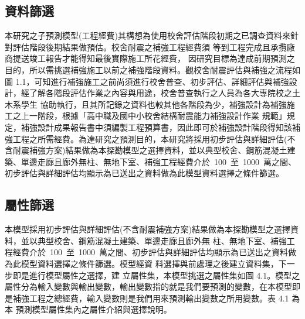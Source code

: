 \subsection{資料篩選}

本研究之子預測模型(工程經費)其構想為使用校舍評估階段初期之已調查資料來針對評估階段後期結果做預估。校舍耐震之補強工程經費須 等到工程完成且承攬廠商提送竣工報告才能得知最後實際施工所花經費， 因研究目標為達成前期預測之目的，所以需挑選補強施工以前之補強階段資料。觀校舍耐震評估與補強之流程如圖 1.1，可知進行補強施工之前尚須進行校舍普查、初步評估、詳細評估與補強設計，經了解各階段評估作業之內容與用途，校舍普查執行之人員為各大專院校之土木系學生 協助執行，且其所記錄之資料也較其他各階段為少，補強設計為補強施工之上一階段，根據「高中職及國中小校舍結構耐震能力補強設計作業 規範」規定，補強設計成果報告書中須編製工程預算書，因此即可於補強設計階段得知該補強工程之所需經費。為達研究之預測目的，本研究將採用初步評估與詳細評估(不含耐震補強方案)結果做為本探勘模型之選擇資料，並以典型校舍、鋼筋混凝土建築、單邊走廊且廊外無柱、無地下室、補強工程經費介於~100~至~1000~萬之間、初步評估與詳細評估均顯示為已送出之資料做為此模型資料選擇之條件篩選。

\subsection{屬性篩選}

本模型採用初步評估與詳細評估(不含耐震補強方案)結果做為本探勘模型之選擇資料，並以典型校舍、鋼筋混凝土建築、單邊走廊且廊外無 柱、無地下室、補強工程經費介於~100~至~1000~萬之間、初步評估與詳細評估均顯示為已送出之資料做為此模型資料選擇之條件篩選。模型經資 料選擇與前處理之後建立資料集，下一步即是進行模型屬性之選擇，建
立屬性集，本模型挑選之屬性集如圖 4.1。模型之屬性分為輸入變數與輸出變數，輸出變數指的就是我們要預測的變數，在本模型即是補強工程之總經費，輸入變數則是我們用來預測輸出變數之所用變數。表 4.1 為本 預測模型屬性集內之屬性介紹與選擇說明。


